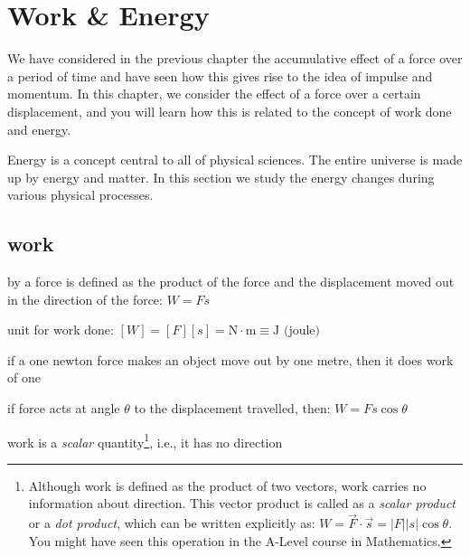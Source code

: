 \section{Work \& Energy}

We have considered in the previous chapter the accumulative effect of a force over a period of time and have seen how this gives rise to the idea of impulse and momentum. In this chapter, we consider the effect of a force over a certain displacement, and you will learn how this is related to the concept of work done and energy.

Energy is a concept central to all of physical sciences. The entire universe is made up by energy and matter. In this section we study the energy changes during various physical processes.

\subsection{work}

\begin{ilight}
	 by a force is defined as the product of the force and the displacement moved out in the direction of the force: $\boxed{W=Fs}$ 
\end{ilight}

\cmt unit for work done: $[W]=[F][s]=\text{N}\cdot\text{m}\equiv \text{J (joule)}$

if a one newton force makes an object move out by one metre, then it does work of one 

\cmt if force acts at angle $\theta$ to the displacement travelled, then: $\boxed{W=Fs\cos\theta} $

\begin{figure}[ht]
	\centering
\end{figure}

\cmt work is a \emph{scalar} quantity\footnote{Although work is defined as the product of two vectors, work carries no information about direction. This vector product is called as a \emph{scalar product} or a \emph{dot product}, which can be written explicitly as: $W = \vec{F} \cdot \vec{s} = |F||s|\cos\theta$. You might have seen this operation in the A-Level course in Mathematics.}, i.e., it has no direction


